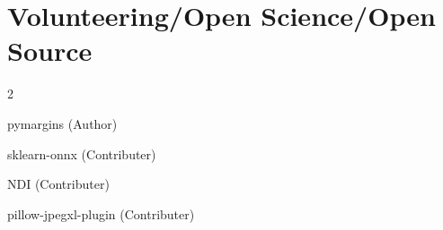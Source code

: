 \documentclass[letterpaper, 11pt]{hunter}
\begin{document}
\section{Volunteering/Open Science/Open Source}
\begin{entryList}{2}
    \item pymargins (Author)
    \item sklearn-onnx (Contributer)
    \item NDI (Contributer)
    \item pillow-jpegxl-plugin (Contributer)
\end{entryList}
\end{document}
